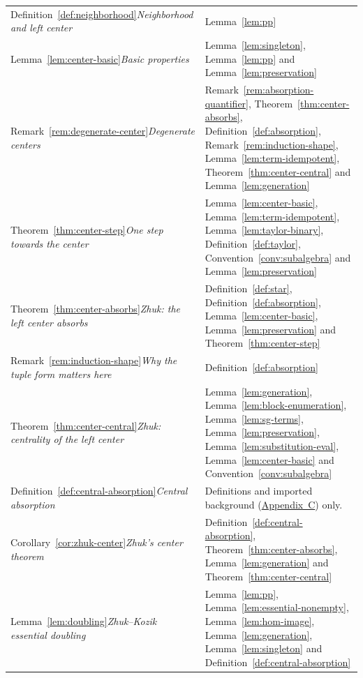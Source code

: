 \documentclass[11pt]{article}
\theoremstyle{mainplain}
\theoremstyle{mainroman}
\theoremstyle{definition}
\numberwithin{equation}{section}
\begin{document}
\begin{longtable}{@{}>{\raggedright\arraybackslash}p{}>{\raggedright\arraybackslash}p{}@{}}
Definition~\ref{def:neighborhood}\newline\emph{Neighborhood and left center} & Lemma~\ref{lem:pp} \\
Lemma~\ref{lem:center-basic}\newline\emph{Basic properties} & Lemma~\ref{lem:singleton}, Lemma~\ref{lem:pp} and Lemma~\ref{lem:preservation} \\
Remark~\ref{rem:degenerate-center}\newline\emph{Degenerate centers} & Remark~\ref{rem:absorption-quantifier}, Theorem~\ref{thm:center-absorbs}, Definition~\ref{def:absorption}, Remark~\ref{rem:induction-shape}, Lemma~\ref{lem:term-idempotent}, Theorem~\ref{thm:center-central} and Lemma~\ref{lem:generation} \\
Theorem~\ref{thm:center-step}\newline\emph{One step towards the center} & Lemma~\ref{lem:center-basic}, Lemma~\ref{lem:term-idempotent}, Lemma~\ref{lem:taylor-binary}, Definition~\ref{def:taylor}, Convention~\ref{conv:subalgebra} and Lemma~\ref{lem:preservation} \\
Theorem~\ref{thm:center-absorbs}\newline\emph{Zhuk: the left center absorbs} & Definition~\ref{def:star}, Definition~\ref{def:absorption}, Lemma~\ref{lem:center-basic}, Lemma~\ref{lem:preservation} and Theorem~\ref{thm:center-step} \\
Remark~\ref{rem:induction-shape}\newline\emph{Why the tuple form matters here} & Definition~\ref{def:absorption} \\
Theorem~\ref{thm:center-central}\newline\emph{Zhuk: centrality of the left center} & Lemma~\ref{lem:generation}, Lemma~\ref{lem:block-enumeration}, Lemma~\ref{lem:sg-terms}, Lemma~\ref{lem:preservation}, Lemma~\ref{lem:substitution-eval}, Lemma~\ref{lem:center-basic} and Convention~\ref{conv:subalgebra} \\
Definition~\ref{def:central-absorption}\newline\emph{Central absorption} & Definitions and imported background (\hyperref[app:background]{Appendix~C}) only. \\
Corollary~\ref{cor:zhuk-center}\newline\emph{Zhuk's center theorem} & Definition~\ref{def:central-absorption}, Theorem~\ref{thm:center-absorbs}, Lemma~\ref{lem:generation} and Theorem~\ref{thm:center-central} \\
Lemma~\ref{lem:doubling}\newline\emph{Zhuk--Kozik essential doubling} & Lemma~\ref{lem:pp}, Lemma~\ref{lem:essential-nonempty}, Lemma~\ref{lem:hom-image}, Lemma~\ref{lem:generation}, Lemma~\ref{lem:singleton} and Definition~\ref{def:central-absorption} \\

\end{longtable}
\end{document}
